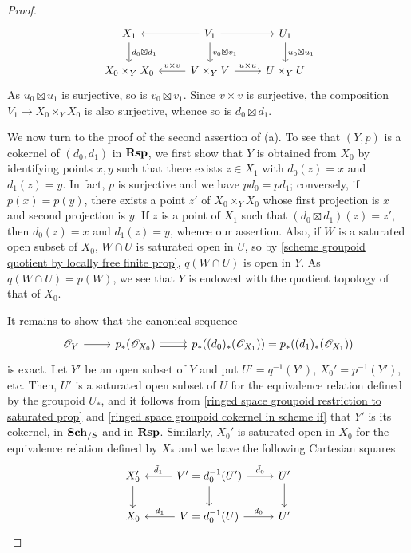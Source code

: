 \begin{proof}
\begin{equation}
\begin{tikzcd}
X_1\ar[d,"d_0\boxtimes d_1"]&V_1\ar[l]\ar[r]\ar[d,"v_0\boxtimes v_1"]&U_1\ar[d,"u_0\boxtimes u_1"]\\
X_0\times_YX_0&V\times_YV\ar[l,swap,"v\times v"]\ar[r,"u\times u"]&U\times_YU
\end{tikzcd}
\end{equation}
As $u_0\boxtimes u_1$ is surjective, so is $v_0\boxtimes v_1$. Since $v\times v$ is surjective, the composition $V_1\to X_0\times_YX_0$ is also surjective, whence so is $d_0\boxtimes d_1$.\par
We now turn to the proof of the second assertion of (a). To see that $(Y,p)$ is a cokernel of $(d_0,d_1)$ in $\mathbf{Rsp}$, we first show that $Y$ is obtained from $X_0$ by identifying points $x,y$ such that there exists $z\in X_1$ with $d_0(z)=x$ and $d_1(z)=y$. In fact, $p$ is surjective and we have $pd_0=pd_1$; conversely, if $p(x)=p(y)$, there exists a point $z'$ of $X_0\times_YX_0$ whose first projection is $x$ and second projection is $y$. If $z$ is a point of $X_1$ such that $(d_0\boxtimes d_1)(z)=z'$, then $d_0(z)=x$ and $d_1(z)=y$, whence our assertion. Also, if $W$ is a saturated open subset of $X_0$, $W\cap U$ is saturated open in $U$, so by \cref{scheme groupoid quotient by locally free finite prop}, $q(W\cap U)$ is open in $Y$. As $q(W\cap U)=p(W)$, we see that $Y$ is endowed with the quotient topology of that of $X_0$.\par
It remains to show that the canonical sequence 
\[\begin{tikzcd}
\mathscr{O}_Y\ar[r]&p_*(\mathscr{O}_{X_0})\ar[r,shift left=2pt]\ar[r,shift right=2pt,swap]&p_*((d_0)_*(\mathscr{O}_{X_1}))=p_*((d_1)_*(\mathscr{O}_{X_1}))
\end{tikzcd}\]
is exact. Let $Y'$ be an open subset of $Y$ and put $U'=q^{-1}(Y')$, $X_0'=p^{-1}(Y')$, etc. Then, $U'$ is a saturated open subset of $U$ for the equivalence relation defined by the groupoid $U_*$, and it follows from \cref{ringed space groupoid restriction to saturated prop} and \cref{ringed space groupoid cokernel in scheme if} that $Y'$ is its cokernel, in $\mathbf{Sch}_{/S}$ and in $\mathbf{Rsp}$. Similarly, $X_0'$ is saturated open in $X_0$ for the equivalence relation defined by $X_*$ and we have the following Cartesian squares
\[\begin{tikzcd}
X_0'\ar[d]&V'=d_0^{-1}(U')\ar[l,swap,"\tilde{d}_1"]\ar[r,"\tilde{d}_0"]\ar[d]&U'\ar[d]\\
X_0&V=d_0^{-1}(U)\ar[l,swap,"d_1"]\ar[r,"d_0"]&U'
\end{tikzcd}\]

\end{proof}

